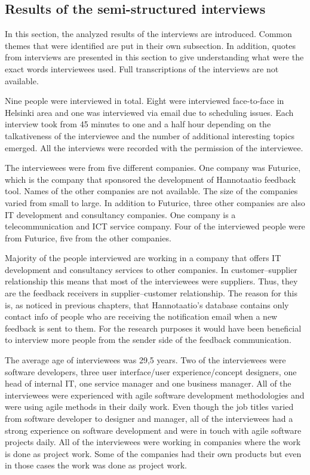 \documentclass[english,12pt,a4paper,pdftex]{article}
\begin{document}
\subsection{Results of the semi-structured interviews}

In this section, the analyzed results of the interviews are introduced. Common themes that were identified are put in their own subsection. In addition, quotes from interviews are presented in this section to give understanding what were the exact words interviewees used. Full transcriptions of the interviews are not available.

Nine people were interviewed in total. Eight were interviewed face-to-face in Helsinki area and one was interviewed  via email due to scheduling issues. Each interview took from 45 minutes to one and a half hour depending on the talkativeness of the interviewee and the number of additional interesting topics emerged. All the interviews were recorded with the permission of the interviewee. 

The interviewees were from five different companies. One company was Futurice, which is the company that sponsored the development of Hannotaatio feedback tool. Names of the other companies are not available. The size of the companies varied from small to large. In addition to Futurice, three other companies are also IT development and consultancy companies. One company is a telecommunication and ICT service company. Four of the interviewed people were from Futurice, five from the other companies.

Majority of the people interviewed are working in a company that offers IT development and consultancy services to other companies. In customer--supplier relationship this means that most of the interviewees were suppliers. Thus, they are the feedback receivers in supplier--customer relationship. The reason for this is, as noticed in previous chapters, that Hannotaatio's database contains only contact info of people who are receiving the notification email when a new feedback is sent to them. For the research purposes it would have been beneficial to interview more people from the sender side of the feedback communication.

The average age of interviewees was 29,5 years. Two of the interviewees were software developers, three user interface/user experience/concept designers, one head of internal IT, one service manager and one business manager. All of the interviewees were experienced with agile software development methodologies and were using agile methods in their daily work. Even though the job titles varied from software developer to designer and manager, all of the interviewees had a strong experience on software development and were in touch with agile software projects daily. All of the interviewees were working in companies where the work is done as project work. Some of the companies had their own products but even in those cases the work was done as project work.
\end{document}
